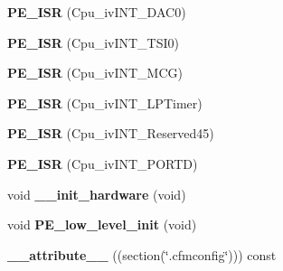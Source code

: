 \begin{DoxyCompactItemize}
\item 
\hypertarget{group___cpu__module_ga38c2812550216db436b9a04c188806b8}{{\bfseries P\-E\-\_\-\-I\-S\-R} (Cpu\-\_\-iv\-I\-N\-T\-\_\-\-D\-A\-C0)}\label{group___cpu__module_ga38c2812550216db436b9a04c188806b8}

\item 
\hypertarget{group___cpu__module_gab80ccc1a0f979348431373976332e165}{{\bfseries P\-E\-\_\-\-I\-S\-R} (Cpu\-\_\-iv\-I\-N\-T\-\_\-\-T\-S\-I0)}\label{group___cpu__module_gab80ccc1a0f979348431373976332e165}

\item 
\hypertarget{group___cpu__module_ga911962460fde9d3de79fa1d9b4838959}{{\bfseries P\-E\-\_\-\-I\-S\-R} (Cpu\-\_\-iv\-I\-N\-T\-\_\-\-M\-C\-G)}\label{group___cpu__module_ga911962460fde9d3de79fa1d9b4838959}

\item 
\hypertarget{group___cpu__module_ga1106f7d4b21c4da019f0aced16612135}{{\bfseries P\-E\-\_\-\-I\-S\-R} (Cpu\-\_\-iv\-I\-N\-T\-\_\-\-L\-P\-Timer)}\label{group___cpu__module_ga1106f7d4b21c4da019f0aced16612135}

\item 
\hypertarget{group___cpu__module_ga6e85aa4261d6eb4f1a4ef96d38368414}{{\bfseries P\-E\-\_\-\-I\-S\-R} (Cpu\-\_\-iv\-I\-N\-T\-\_\-\-Reserved45)}\label{group___cpu__module_ga6e85aa4261d6eb4f1a4ef96d38368414}

\item 
\hypertarget{group___cpu__module_gada70f6e2afb564cf49abd9676d709001}{{\bfseries P\-E\-\_\-\-I\-S\-R} (Cpu\-\_\-iv\-I\-N\-T\-\_\-\-P\-O\-R\-T\-D)}\label{group___cpu__module_gada70f6e2afb564cf49abd9676d709001}

\item 
\hypertarget{group___cpu__module_ga32a8d86789a3326b3120bf1e1c1d4252}{void {\bfseries \-\_\-\-\_\-init\-\_\-hardware} (void)}\label{group___cpu__module_ga32a8d86789a3326b3120bf1e1c1d4252}

\item 
\hypertarget{group___cpu__module_ga95039f54c45f24c1b4ed640fa2f63f11}{void {\bfseries P\-E\-\_\-low\-\_\-level\-\_\-init} (void)}\label{group___cpu__module_ga95039f54c45f24c1b4ed640fa2f63f11}

\item 
\hypertarget{group___cpu__module_ga2d9b5b981f451cdf47bf43b4f9cc9e03}{{\bfseries \-\_\-\-\_\-attribute\-\_\-\-\_\-} ((section(\char`\"{}.cfmconfig\char`\"{}))) const}\label{group___cpu__module_ga2d9b5b981f451cdf47bf43b4f9cc9e03}

\end{DoxyCompactItemize}
